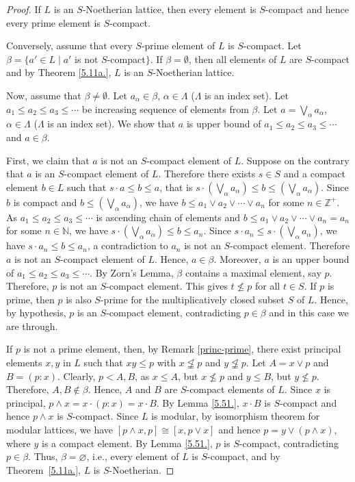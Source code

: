 \documentclass[10pt,twoside,a4]{amsart}
\numberwithin{equation}{section}
\theoremstyle{plain}
\theoremstyle{definition}
\begin{document}
\begin{proof}If $L$ is an $S$-Noetherian lattice, then every element is $S$-compact and hence every prime element is $S$-compact. 
	
	
	Conversely, assume that every $S$-prime element of $L$  is $S$-compact. Let $\beta = \{a' \in L\; |\; a'$ is not  $S$-compact$\}$. If $\beta = \emptyset$, then all elements of $L$ are $S$-compact and by Theorem \ref{5.11a.}, $L$ is an $S$-Noetherian lattice.
	
	Now, assume that $\beta \neq \emptyset$. Let $a_{\alpha} \in \beta$, $\alpha \in \Lambda$ ($\Lambda$ is an index set). Let $ a_1 \leq a_2 \leq a_3 \leq \cdots$ be increasing sequence of elements from $\beta$. Let $a = \bigvee_{\alpha} a_{\alpha}$, $\alpha \in \Lambda$ ($\Lambda$ is an index set). We show that $a$ is upper bound of $a_1 \leq a_2 \leq a_3 \leq \cdots$ and $a \in \beta$.
	
	First, we claim that $a$ is not an $S$-compact element of $L$. Suppose on the contrary that $a$ is an $S$-compact element of $L$. Therefore there exists $s \in S$ and a compact element $b \in L$ such that $s \cdot  a \leq b \leq a$, that is $s \cdot (\bigvee_{\alpha} a_{\alpha}) \leq b \leq (\bigvee_{\alpha} a_{\alpha})$. Since $b$ is compact and  $b \leq (\bigvee_{\alpha} a_{\alpha})$, we have $b \leq a_1 \vee a_2 \vee \cdots \vee a_n$ for some $ n \in \mathbb{Z}^{+}$. As  $a_1 \leq a_2 \leq a_3 \leq \cdots$ is ascending chain of elements and $b \leq a_1 \vee a_2 \vee \cdots \vee a_n=a_n$ for some $n \in \mathbb{N}$,  we have $s \cdot (\bigvee_{\alpha} a_{\alpha})  \leq b \leq a_n$. Since $s \cdot a_n \leq s \cdot (\bigvee_{\alpha} a_{\alpha})$, we have $s \cdot  a_n \leq b\leq a_n$, a contradiction to $a_n$ is not an $S$-compact element. Therefore  $a$ is not an $S$-compact element of $L$.  Hence,  $a \in \beta$. Moreover, $a$ is an upper bound of  $a_1 \leq a_2 \leq a_3 \leq \cdots$. By Zorn's Lemma, $\beta$ contains a maximal element, say $p$. Therefore, $p$ is not an $S$-compact element. This gives $t\nleq p$ for all $t\in S$.
	If $p$ is prime, then $p$ is also $S$-prime for the multiplicatively closed subset $S$ of $L$. Hence, by hypothesis, $p$ is an $S$-compact element, contradicting $p\in\beta$ and in this case we are through. 
	
	If $p$ is not a prime element, then, by Remark \ref{princ-prime}, there exist principal elements $x, y$ in $L$ such that $xy \leq p$ with $x \not\leqq p$ and $y \not\leqq p$. Let $A = x \vee p$ and $B = (p : x)$. Clearly, $p<A,B$, as $x\leq A$, but $x\nleq p$ and $y\leq B$, but $y\nleq p$. Therefore, $A,B\notin \beta$. Hence, $A$ and $B$ are $S$-compact elements of $L$. Since $x$ is principal, $p \wedge x = x \cdot (p: x) = x \cdot  B$. By Lemma \ref{5.51.}, $x \cdot B$ is $S$-compact and hence $p \wedge x$ is $S$-compact. Since $L$ is modular, by  isomorphism theorem for modular lattices, we have 
	$[p\wedge x, p] \cong [x, p\vee x]$ and hence $p = y \vee (p \wedge x)$, where $y$ is a compact element. By Lemma \ref{5.51.}, $p$ is $S$-compact, contradicting $p\in\beta$.
	Thus, $\beta=\varnothing$, i.e., every element of $L$ is $S$-compact, and by Theorem~\ref{5.11a.}, $L$ is $S$-Noetherian.
\end{proof}
\end{document}
